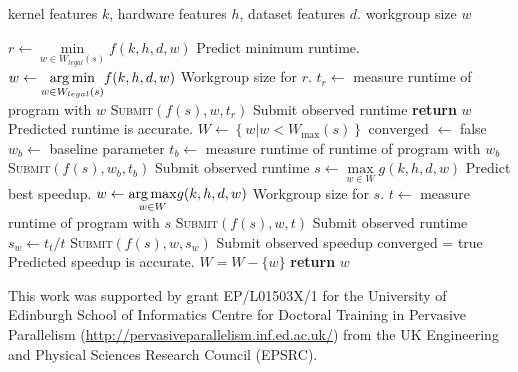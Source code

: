 \documentclass[nonatbib,preprint,11pt]{sigplanconf}
\begin{document}
\begin{algorithm}
\begin{algorithmic}[1]
\Require kernel features $k$, hardware features $h$, dataset features $d$.
\Ensure workgroup size $w$

\State $r \leftarrow \underset{w \in W_{legal}(s)}{\min} f(k,h,d,w)$
\Comment Predict minimum runtime.
\State $w \leftarrow \underset{w \in W_{legal}(s)}{\operatorname*{arg\,min}} f(k,h,d,w)$
\Comment Workgroup size for $r$.
\State $t_r \leftarrow$ measure runtime of program with $w$
\State \textsc{Submit}$\left( f(s), w, t_r \right)$
\Comment Submit observed runtime
  \State \textbf{return} $w$
\Comment Predicted runtime is accurate.
\Else
   \State $W \leftarrow \left\{ w | w < W_{\max}(s) \right\}$
   \State converged $\leftarrow$ false
   \State $w_b \leftarrow$ baseline parameter
   \State $t_b \leftarrow$ measure runtime of runtime of program with
   $w_b$
   \State \textsc{Submit}$\left( f(s), w_b, t_b \right)$
   \Comment Submit observed runtime
     \State $s \leftarrow \underset{w \in W}{\max} g(k,h,d,w)$
     \Comment Predict best speedup.
     \State $w \leftarrow \underset{w \in W}{\operatorname*{arg\,max}} g(k,h,d,w)$
     \Comment Workgroup size for $s$.
     \State $t \leftarrow$ measure runtime of program with $s$
     \State \textsc{Submit}$\left( f(s), w, t \right)$
     \Comment Submit observed runtime
     \State $s_w \leftarrow t_t / t$
     \State \textsc{Submit}$\left( f(s), w, s_w \right)$
     \Comment Submit observed speedup
       \State converged = true
       \Comment Predicted speedup is accurate.
     \Else
       \State $W = W - \{ w \}$
     \EndIf
   \EndWhile
   \State \textbf{return} $w$
\EndIf
\end{algorithmic}
\caption{%
  Selecting workgroup size using a combination of classifiers and
  regressors.%
}
\label{alg:autotune-hybrid}
\end{algorithm}



%
%
%

\acks

This work was supported by grant EP/L01503X/1 for the University of
Edinburgh School of Informatics Centre for Doctoral Training in
Pervasive Parallelism (\url{http://pervasiveparallelism.inf.ed.ac.uk/}) from
the UK Engineering and Physical Sciences Research Council (EPSRC).


\label{bibliography}
\printbibliography
\end{document}
